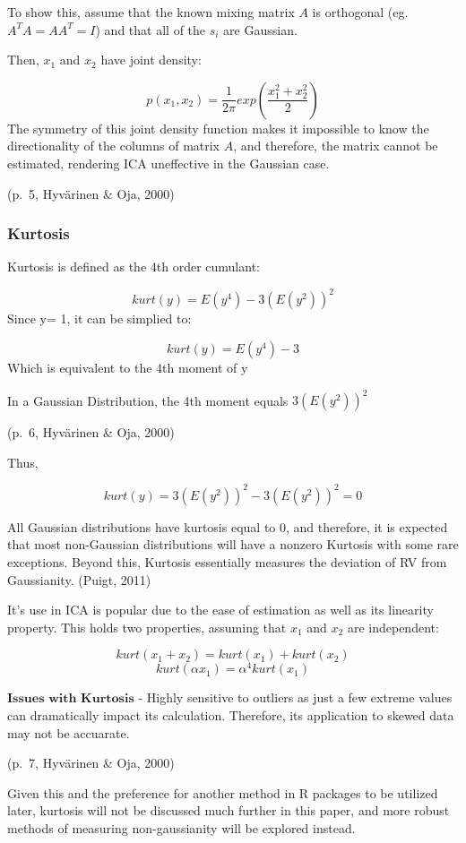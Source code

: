 \documentclass[12pt,twoside]{amherstthesis}
\begin{document}
  To show this, assume that the known mixing matrix \(A\) is orthogonal
  (eg. \(A^{T}A = AA^{T}= I\)) and that all of the \(s_i\) are Gaussian.
  
  Then, \(x_1\) and \(x_2\) have joint density:
  
  \[ p(x_1,x_2) = \frac{1}{2\pi}exp{(\frac{x_1^2+x_2^2}{2})}\] The
  symmetry of this joint density function makes it impossible to know the
  directionality of the columns of matrix \(A\), and therefore, the matrix
  cannot be estimated, rendering ICA uneffective in the Gaussian case.
  
  (p.~5, Hyvärinen \& Oja, 2000)
  
  \subsubsection{Kurtosis}\label{kurtosis}
  
  Kurtosis is defined as the 4th order cumulant:
  
  \[ kurt(y) = E(y^4) - 3(E(y^2))^2\] Since y= 1, it can be simplied to:
  
  \[ kurt(y) = E(y^4) - 3 \] Which is equivalent to the 4th moment of y
  
  In a Gaussian Distribution, the 4th moment equals \(3(E(y^2))^2\)
  
  (p.~6, Hyvärinen \& Oja, 2000)
  
  Thus,
  
  \[ kurt(y) = 3(E(y^2))^2 - 3(E(y^2))^2 = 0 \]
  
  All Gaussian distributions have kurtosis equal to 0, and therefore, it
  is expected that most non-Gaussian distributions will have a nonzero
  Kurtosis with some rare exceptions. Beyond this, Kurtosis essentially
  measures the deviation of RV from Gaussianity. (Puigt, 2011)
  
  It's use in ICA is popular due to the ease of estimation as well as its
  linearity property. This holds two properties, assuming that \(x_1\) and
  \(x_2\) are independent:
  
  \[ kurt(x_1 + x_2) = kurt(x_1) + kurt(x_2)\]
  \[ kurt(\alpha x_1) = \alpha^4 kurt(x_1)\]
  
  \(\textbf{Issues with Kurtosis}\) - Highly sensitive to outliers as just
  a few extreme values can dramatically impact its calculation. Therefore,
  its application to skewed data may not be accuarate.
  
  (p.~7, Hyvärinen \& Oja, 2000)
  
  Given this and the preference for another method in R packages to be
  utilized later, kurtosis will not be discussed much further in this
  paper, and more robust methods of measuring non-gaussianity will be
  explored instead.
  
\end{document}
